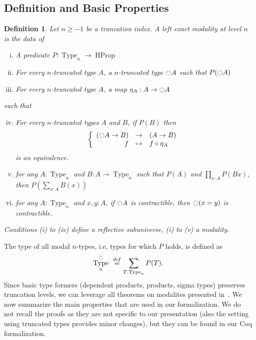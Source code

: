 \documentclass[conference]{IEEEtran}
\newtheorem{defi}[thm]{Definition}
\newcommand \defeq {\overset{de\hspace{-0.2ex}f}{=}}
\newcommand{\ie}{i.e,\xspace}
\DeclareMathOperator{\Type}{Type}
\DeclareMathOperator{\HProp}{HProp}
\newcommand{\modal}{\ensuremath{\ocircle}}
\begin{document}
\subsection{Definition and Basic Properties}
\label{sec:definition}

\begin{defi}
  \label{sec:defin-basic-prop-1}
  Let $n\geq -1$ be a truncation index. A left exact modality at level
  $n$ is the data of
  \begin{enumerate}[(i)]
  \item A predicate $P:\Type_n \to \HProp$
  \item For every $n$-truncated type $A$, a $n$-truncated type
    $\modal A$ such that $P(\modal A)$
  \item For every $n$-truncated type $A$, a map $\eta_A:A \to
    \modal A$
  \end{enumerate}
  such that
  \begin{enumerate}[(i)]
    \setcounter{enumi}{3}
  \item For every $n$-truncated types $A$ and $B$, if $P(B)$ then
    $$\left\{
      \begin{array}{rcl}
        (\modal A \to B) & \to & (A \to B) \\
        f & \mapsto & f \circ \eta_A
      \end{array} \right.$$
    is an equivalence.
  \item for any $A:\Type_n$ and $B:A \to \Type_n$ such that $P(A)$
    and $\prod_{x:A} P(B x)$, then $P\left( \sum_{x:A} B(x)\right)$
  \item for any $A:\Type_n$ and $x,y:A$, if $\modal A$ is
    contractible, then $\modal (x=y)$ is contractible.
  \end{enumerate}
  Conditions (i) to (iv) define a {\em reflective subuniverse}, (i) to
  (v) a {\em modality}.
\end{defi}

The type of all modal $n$-types, \ie types for which $P$ holds, is
defined as %
$$
\Type_n^\modal \ \defeq \sum_{T : \Type_n} P (T).
$$
%
Since basic type formers (dependent products, products, sigma types)
preserves truncation levels, we can leverage all theorems on modalites
presented in~\cite[Chapter 7.7]{hottbook}.
%
We now summarize the main properties that are used in our
formalization. We do not recall the proofs as they are not specific to
our presentation (also the setting using truncated types provides
minor changes), but they can be found in our Coq formalization. 
 
\end{document}

